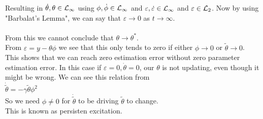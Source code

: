 \begin{enumerate}
    Resulting in $\dot{\theta}, \theta \in \mathcal{L}_{\infty}$ using $\phi, \dot{\phi} \in \mathcal{L}_{\infty}$ and $\varepsilon, \dot{\varepsilon} \in \mathcal{L}_{\infty}$ and $\varepsilon \in \mathcal{L}_2$. Now by using "Barbalat's Lemma", we can say that 
    $\varepsilon \rightarrow 0$ as $t \rightarrow \infty$.
    \\
    \\
    From this we cannot conclude that $\theta \rightarrow \theta^*$. \\
    From $\varepsilon = y - \theta \phi$ we see that this only tends to zero if either $\phi \rightarrow 0$ or $\tilde{\theta} \rightarrow 0$. \\
    This shows that we can reach zero estimation error without zero parameter estimation error. 
    In this case if $\varepsilon = 0, \dot{\theta} = 0$, our $\theta$ is not updating, even though it might be wrong. We can see this relation from \\ 
    \begin{math}
        \dot{\tilde{\theta}} = - \gamma \tilde{\theta} \phi^2 
    \end{math} \\
    So we need $\phi \neq 0$ for $\dot{\tilde{\theta}}$ to be driving $\tilde{\theta}$ to change. \\ 
    This is known as persisten excitation. 
    
\end{enumerate}